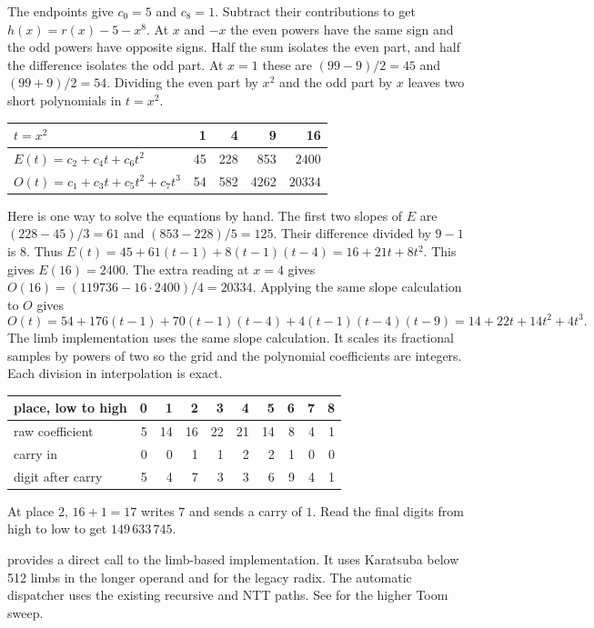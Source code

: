 The endpoints give $c_0=5$ and $c_8=1$. Subtract their contributions to get
$h(x)=r(x)-5-x^8$. At $x$ and $-x$ the even powers have the same sign and
the odd powers have opposite signs. Half the sum isolates the even part,
and half the difference isolates the odd part. At $x=1$ these are
$(99-9)/2=45$ and $(99+9)/2=54$. Dividing the even part by $x^2$ and the
odd part by $x$ leaves two short polynomials in $t=x^2$.

\begin{center}
\small
\begin{tabular}{lrrrr}
\toprule
$t=x^2$ & 1 & 4 & 9 & 16 \\
\midrule
$E(t)=c_2+c_4t+c_6t^2$ & 45 & 228 & 853 & $2400$ \\
$O(t)=c_1+c_3t+c_5t^2+c_7t^3$ & 54 & 582 & 4262 & $20334$ \\
\bottomrule
\end{tabular}
\end{center}

Here is one way to solve the equations by hand. The first two slopes of
$E$ are $(228-45)/3=61$ and $(853-228)/5=125$. Their difference divided
by $9-1$ is $8$. Thus
$E(t)=45+61(t-1)+8(t-1)(t-4)=16+21t+8t^2$. This gives $E(16)=2400$.
The extra reading at $x=4$ gives $O(16)=(119736-16\cdot2400)/4=20334$.
Applying the same slope calculation to $O$ gives
\[
O(t)=54+176(t-1)+70(t-1)(t-4)+4(t-1)(t-4)(t-9)
    =14+22t+14t^2+4t^3 .
\]
The limb implementation uses the same slope calculation. It scales its
fractional samples by powers of two so the grid and the polynomial
coefficients are integers. Each division in interpolation is exact.

\begin{center}
\small
\begin{tabular}{lrrrrrrrrr}
\toprule
place, low to high & 0 & 1 & 2 & 3 & 4 & 5 & 6 & 7 & 8 \\
\midrule
raw coefficient & 5 & 14 & 16 & 22 & 21 & 14 & 8 & 4 & 1 \\
carry in & 0 & 0 & 1 & 1 & 2 & 2 & 1 & 0 & 0 \\
digit after carry & 5 & 4 & 7 & 3 & 3 & 6 & 9 & 4 & 1 \\
\bottomrule
\end{tabular}
\end{center}

At place 2, $16+1=17$ writes $7$ and sends a carry of $1$. Read the final
digits from high to low to get $149\,633\,745$.

\begin{practice}
 provides a direct call to the limb-based
implementation. It uses Karatsuba below 512 limbs in the longer operand
and for the legacy radix. The automatic dispatcher uses the existing
recursive and NTT paths. See  for the higher Toom sweep.
\end{practice}

